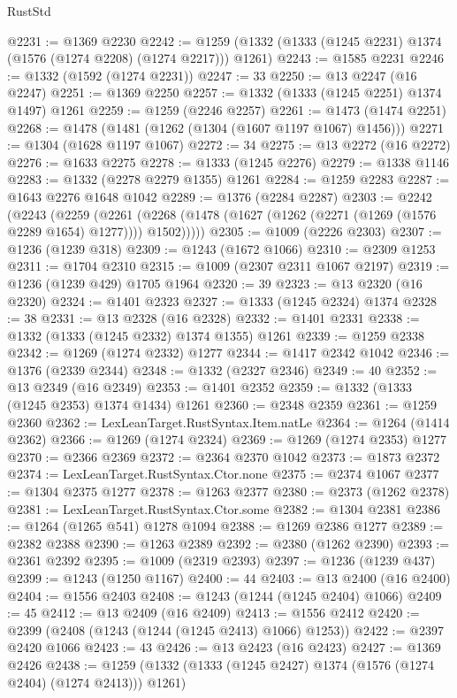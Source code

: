 \begin{lexlean}{RustStd}
\begin{coremodule}
{\begin{coremodule}
{{{{{{{{{{{{{{{{{{{{{{{{{{{{{{{{{{{@2231 := @1369 @2230
@2242 := @1259 (@1332 (@1333 (@1245 @2231) @1374 (@1576 (@1274 @2208) (@1274 @2217))) @1261)
@2243 := @1585 @2231
@2246 := @1332 (@1592 (@1274 @2231))
@2247 := 33
@2250 := @13 @2247 (@16 @2247)
@2251 := @1369 @2250
@2257 := @1332 (@1333 (@1245 @2251) @1374 @1497) @1261
@2259 := @1259 (@2246 @2257)
@2261 := @1473 (@1474 @2251)
@2268 := @1478 (@1481 (@1262 (@1304 (@1607 @1197 @1067) @1456)))
@2271 := @1304 (@1628 @1197 @1067)
@2272 := 34
@2275 := @13 @2272 (@16 @2272)
@2276 := @1633 @2275
@2278 := @1333 (@1245 @2276)
@2279 := @1338 @1146
@2283 := @1332 (@2278 @2279 @1355) @1261
@2284 := @1259 @2283
@2287 := @1643 @2276 @1648 @1042
@2289 := @1376 (@2284 @2287)
@2303 := @2242
    (@2243
      (@2259
        (@2261 (@2268 (@1478 (@1627 (@1262 (@2271 (@1269 (@1576 @2289 @1654) @1277)))) @1502)))))
@2305 := @1009 (@2226 @2303)
@2307 := @1236 (@1239 @318)
@2309 := @1243 (@1672 @1066)
@2310 := @2309 @1253
@2311 := @1704 @2310
@2315 := @1009 (@2307 @2311 @1067 @2197)
@2319 := @1236 (@1239 @429) @1705 @1964
@2320 := 39
@2323 := @13 @2320 (@16 @2320)
@2324 := @1401 @2323
@2327 := @1333 (@1245 @2324) @1374
@2328 := 38
@2331 := @13 @2328 (@16 @2328)
@2332 := @1401 @2331
@2338 := @1332 (@1333 (@1245 @2332) @1374 @1355) @1261
@2339 := @1259 @2338
@2342 := @1269 (@1274 @2332) @1277
@2344 := @1417 @2342 @1042
@2346 := @1376 (@2339 @2344)
@2348 := @1332 (@2327 @2346)
@2349 := 40
@2352 := @13 @2349 (@16 @2349)
@2353 := @1401 @2352
@2359 := @1332 (@1333 (@1245 @2353) @1374 @1434) @1261
@2360 := @2348 @2359
@2361 := @1259 @2360
@2362 := LexLeanTarget.RustSyntax.Item.natLe
@2364 := @1264 (@1414 @2362)
@2366 := @1269 (@1274 @2324)
@2369 := @1269 (@1274 @2353) @1277
@2370 := @2366 @2369
@2372 := @2364 @2370 @1042
@2373 := @1873 @2372
@2374 := LexLeanTarget.RustSyntax.Ctor.none
@2375 := @2374 @1067
@2377 := @1304 @2375 @1277
@2378 := @1263 @2377
@2380 := @2373 (@1262 @2378)
@2381 := LexLeanTarget.RustSyntax.Ctor.some
@2382 := @1304 @2381
@2386 := @1264 (@1265 @541) @1278 @1094
@2388 := @1269 @2386 @1277
@2389 := @2382 @2388
@2390 := @1263 @2389
@2392 := @2380 (@1262 @2390)
@2393 := @2361 @2392
@2395 := @1009 (@2319 @2393)
@2397 := @1236 (@1239 @437)
@2399 := @1243 (@1250 @1167)
@2400 := 44
@2403 := @13 @2400 (@16 @2400)
@2404 := @1556 @2403
@2408 := @1243 (@1244 (@1245 @2404) @1066)
@2409 := 45
@2412 := @13 @2409 (@16 @2409)
@2413 := @1556 @2412
@2420 := @2399 (@2408 (@1243 (@1244 (@1245 @2413) @1066) @1253))
@2422 := @2397 @2420 @1066
@2423 := 43
@2426 := @13 @2423 (@16 @2423)
@2427 := @1369 @2426
@2438 := @1259 (@1332 (@1333 (@1245 @2427) @1374 (@1576 (@1274 @2404) (@1274 @2413))) @1261)
}}}}}}}}}}}}}}}}}}}}}}}}}}}}}}}}}}}
\end{coremodule}}
\end{coremodule}
\end{lexlean}
